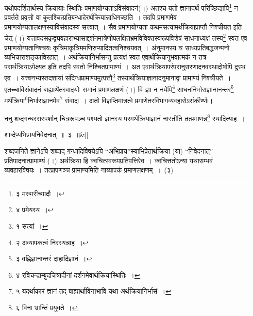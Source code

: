 \documentclass[article,12pt,a4paper]{memoir}
\begin{document}
	  \pstart यथोपदर्शितार्थस्य क्रियायाः स्थितिः प्रमाणयोग्यताऽविसंवादनं(।) अतश्च यतो ज्ञानादर्थं परिच्छिद्यापि\footnote{\label{pvv.3-3}  ३ मरुमरीच्यादौ ।} न प्रवर्तते प्रवृत्तो वा कुतश्चित्प्रतिबन्धादेरर्थक्रियान्नाधिगच्छति । तदपि प्रमाणमेव प्रमाणयोग्यतालक्षणस्याविसंवादस्य सत्त्वात् । सैव प्रमाणयोग्यता कथमसत्यामर्थक्रियाप्राप्तौ निश्चीयत इति चेत् (।) यत्तावदसकृद्व्यवहाराभ्यासाद्दर्शनमात्रेणोपलक्षितभ्रमविविक्तस्वरूपविशेषं साधनाध्यक्षं तस्य\footnote{\label{pvv.3-4}  ४ प्रमेयस्य ।} \leavevmode{} स्वत एव प्रमाणयोग्यतानिश्चयः कृत्रिमाकृत्रिममणिरुप्यादितत्वनिश्चयवत् । अंनुमानस्य च साध्यप्रतिबद्धजन्मनो व्यभिचाराशङ्काविरहात् । अर्थक्रियानिर्भासन्तु प्रत्यक्षं स्वत एवार्थक्रियानुभवात्मकं न तत्र परार्थक्रियाऽपेक्ष्यत इति तदपि स्वतो निश्चितप्रामाण्यं । अत एवार्थक्रियापरंपरानुसरणादनवस्थादोषोपि दुस्थ एव । यत्त्वनभ्यस्तदशायां संदिग्धप्रामाण्यमुत्पत्तौ\footnote{\label{pvv.4-1}  १ सत्यां ।} तस्यार्थक्रियाज्ञानादनुमानाद्वा प्रामाण्यं निश्चीयते । एतच्चाविसंवादनं बाह्यार्थेतरवादयोः समानं प्रमाणलक्षणं (।) वि ज्ञा न नयेपि\footnote{\label{pvv.4-2}  २ अव्यापकत्वं निरस्यन्नाह ।} साधननिर्भासज्ञानानन्तर\footnote{\label{pvv.4-3}  ३ वह्निज्ञानान्तरं दाहादिज्ञानं ।} मर्थंक्रिया\footnote{\label{pvv.4-4}  ४ रविचन्द्राम्बुदचित्रादीनां दर्शनमेवार्थक्रियास्थितिः ।}निर्भासज्ञानमेव\footnote{\label{pvv.4-5}  ५ यदर्थाकारं ज्ञानं तद् बाह्यार्थाविनाभावि यथा अर्थक्रियानिर्भासं ।} संवादः । अतो विज्ञप्तिमात्रत्वे प्रमाणेतरविभागव्यवहारोऽसंकीर्ण्णः।
	\pend
      

	  \pstart ननु शब्दगन्धरसस्पर्शान् चित्ररूपञ्च पश्यतो ज्ञानस्य परमर्थक्रियाज्ञानं नास्तीति तत्प्रमाणन्न\footnote{\label{pvv.4-6}  ६ विना भ्रान्तिं प्रयुक्ते ।} स्यादित्याह ।
	\pend
      
	  \bigskip
	  \begingroup
	
	    \large
	  
	    
	    \stanza[\smallbreak]
	\label{pv.1.3c}शाब्देप्यभिप्रायनिवेदनात् ॥ ३ ॥\&[\smallbreak]


	
	  \endgroup
	

	   शब्दजनिते ज्ञानेऽपि शब्दाद् गन्धादिविषयेऽपि {\color{DodgerBlue3}“अभिप्राय”}स्याभिप्रेतार्थक्रिया (या) {\color{DodgerBlue3}“निवेदनात्”} प्रतिपादनात्प्रामाण्यं (।) अर्थक्रिया हि क्वचित्स्वरूपप्रतिपत्तिरेव । क्वचित्ततोऽन्या यथासम्भवं व्यवहारविषयः । तत्प्रापणञ्च प्रामाण्यमिति नाव्यापकं प्रमाणलक्षणम् । (३)
	\pend
      \label{div_pvv.1.4}
	  
\end{document}
